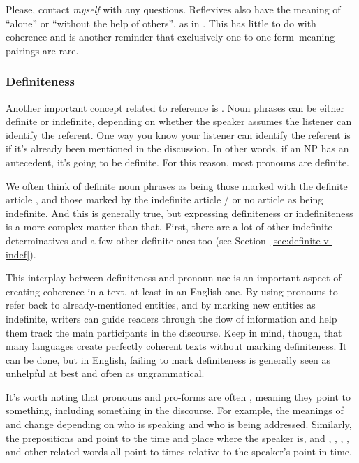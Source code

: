 \ea Please, contact \emph{myself} with any questions.\label{ex:social-myself}
\z
Reflexives also have the meaning of \enquote{alone} or \enquote{without the help of others}, as in . This has little to do with coherence and is another reminder that exclusively one-to-one form--meaning pairings are rare.

\subsubsection*{Definiteness}
Another important concept related to reference is . Noun phrases can be either definite or indefinite, depending on whether the speaker assumes the listener can identify the referent. One way you know your listener can identify the referent is if it's already been mentioned in the discussion. In other words, if an NP has an antecedent, it's going to be definite. For this reason, most pronouns are definite.

We often think of definite noun phrases as being those marked with the definite article , and those marked by the indefinite article / or no article as being indefinite. And this is generally true, but expressing definiteness or indefiniteness is a more complex matter than that. First, there are a lot of other indefinite determinatives and a few other definite ones too (see Section~\ref{sec:definite-v-indef}).

This interplay between definiteness and pronoun use is an important aspect of creating coherence in a text, at least in an English one. By using pronouns to refer back to already-mentioned entities, and by marking new entities as indefinite, writers can guide readers through the flow of information and help them track the main participants in the discourse. Keep in mind, though, that many languages create perfectly coherent texts without marking definiteness. It can be done, but in English, failing to mark definiteness is generally seen as unhelpful at best and often as ungrammatical.

It's worth noting that pronouns and pro-forms are often , meaning they point to something, including something in the discourse. For example, the meanings of  and  change depending on who is speaking and who is being addressed. Similarly, the prepositions  and  point to the time and place where the speaker is, and , , , , and other related words all point to times relative to the speaker's point in time.

